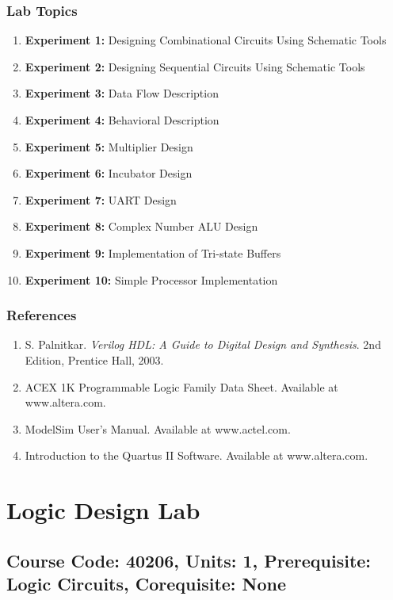 \documentclass[12pt]{article}
\begin{document}
\subsubsection*{Lab Topics}
\begin{enumerate}
    \item \textbf{Experiment 1:} Designing Combinational Circuits Using Schematic Tools
    \item \textbf{Experiment 2:} Designing Sequential Circuits Using Schematic Tools
    \item \textbf{Experiment 3:} Data Flow Description
    \item \textbf{Experiment 4:} Behavioral Description
    \item \textbf{Experiment 5:} Multiplier Design
    \item \textbf{Experiment 6:} Incubator Design
    \item \textbf{Experiment 7:} UART Design
    \item \textbf{Experiment 8:} Complex Number ALU Design
    \item \textbf{Experiment 9:} Implementation of Tri-state Buffers
    \item \textbf{Experiment 10:} Simple Processor Implementation
\end{enumerate}

\subsubsection*{References}
\begin{enumerate}
    \item S. Palnitkar. \textit{Verilog HDL: A Guide to Digital Design and Synthesis}. 2nd Edition, Prentice Hall, 2003.
    \item ACEX 1K Programmable Logic Family Data Sheet. Available at www.altera.com.
    \item ModelSim User's Manual. Available at www.actel.com.
    \item Introduction to the Quartus II Software. Available at www.altera.com.
\end{enumerate}

\newpage

\section{Logic Design Lab}
\subsection*{Course Code: 40206, Units: 1, Prerequisite: Logic Circuits, Corequisite: None}
\end{document}
